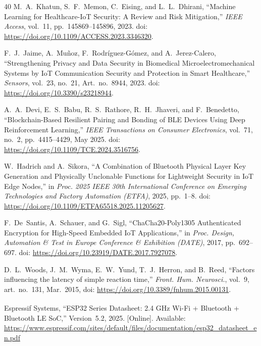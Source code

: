 \documentclass[journal]{IEEEtran}
\begin{document}
\begin{thebibliography}{40}
M.~A.~Khatun, S.~F.~Memon, C.~Eising, and L.~L.~Dhirani, ``Machine Learning for Healthcare-IoT Security: A Review and Risk Mitigation,'' \emph{IEEE Access}, vol.~11, pp.~145869--145896, 2023. doi: \url{https://doi.org/10.1109/ACCESS.2023.3346320}.

F.~J.~Jaime, A.~Mu{\~n}oz, F.~Rodr{\'i}guez-G{\'o}mez, and A.~Jerez-Calero, ``Strengthening Privacy and Data Security in Biomedical Microelectromechanical Systems by IoT Communication Security and Protection in Smart Healthcare,'' \emph{Sensors}, vol.~23, no.~21, Art.~no.~8944, 2023. doi: \url{https://doi.org/10.3390/s23218944}.

A.~A.~Devi, E.~S.~Babu, R.~S.~Rathore, R.~H.~Jhaveri, and F.~Benedetto, ``Blockchain-Based Resilient Pairing and Bonding of BLE Devices Using Deep Reinforcement Learning,'' \emph{IEEE Transactions on Consumer Electronics}, vol.~71, no.~2, pp.~4415--4429, May 2025. doi: \url{https://doi.org/10.1109/TCE.2024.3516756}.

W.~Hadrich and A.~Sikora, ``A Combination of Bluetooth Physical Layer Key Generation and Physically Unclonable Functions for Lightweight Security in IoT Edge Nodes,'' in \emph{Proc. 2025 IEEE 30th International Conference on Emerging Technologies and Factory Automation (ETFA)}, 2025, pp.~1--8. doi: \url{https://doi.org/10.1109/ETFA65518.2025.11205627}.

F.~De~Santis, A.~Schauer, and G.~Sigl, ``ChaCha20-Poly1305 Authenticated Encryption for High-Speed Embedded IoT Applications,'' in \emph{Proc. Design, Automation \& Test in Europe Conference \& Exhibition (DATE)}, 2017, pp.~692--697. doi: \url{https://doi.org/10.23919/DATE.2017.7927078}.

D.~L.~Woods, J.~M.~Wyma, E.~W.~Yund, T.~J.~Herron, and B.~Reed, ``Factors influencing the latency of simple reaction time,'' \emph{Front. Hum. Neurosci.}, vol.~9, art.~no.~131, Mar.~2015, doi: \url{https://doi.org/10.3389/fnhum.2015.00131}.

Espressif Systems, ``ESP32 Series Datasheet: 2.4 GHz Wi-Fi + Bluetooth\textsuperscript{\textregistered} + Bluetooth LE SoC,'' Version~5.2, 2025. [Online]. Available: \url{https://www.espressif.com/sites/default/files/documentation/esp32_datasheet_en.pdf}

\end{thebibliography}
\end{document}
